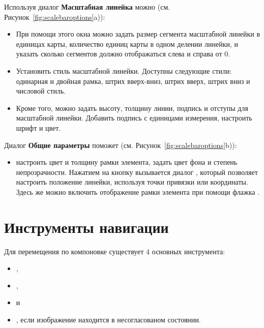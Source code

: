 
Используя диалог \textbf{Масштабная линейка} можно
(см. Рисунок~\ref{fig:scalebaroptions}a)):

\begin{itemize}[label=--]
\item При помощи этого окна можно задать размер сегмента масштабной
линейки в единицах карты, количество единиц карты в одном делении
линейки, и указать сколько сегментов должно отображаться слева и справа
от 0.
\item Установить стиль масштабной линейки. Доступны следующие стили:
одинарная и двойная рамка, штрих вверх-вниз, штрих вверх, штрих вниз и
числовой стиль.
\item Кроме того, можно задать высоту, толщину линии, подпись и отступы
для масштабной линейки. Добавить подпись с единицами измерения, настроить
шрифт и цвет.
\end{itemize}


Диалог \textbf{Общие параметры} поможет (см. Рисунок~\ref{fig:scalebaroptions}b)):

\begin{itemize}[label=--]
\item настроить цвет и толщину рамки элемента, задать цвет фона и
степень непрозрачности. Нажатием на кнопку 
вызывается диалог , который позволяет
настроить положение линейки, используя точки привязки или координаты.
Здесь же можно включить отображение рамки элемента при помощи флажка
.
\end{itemize}

\section{Инструменты навигации}

Для перемещения по компоновке существует 4 основных инструмента:

\begin{itemize}[label=--]
\item {},
\item {},
\item {} и
\item {}, если изображение находится в
несогласованом состоянии.
\end{itemize}

